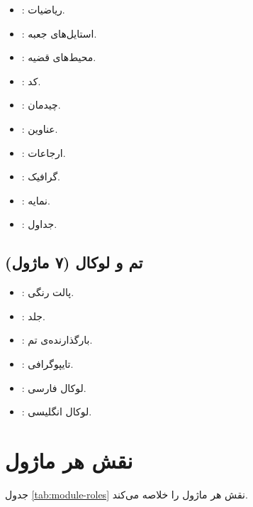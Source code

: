 \begin{itemize}
    \item {}: ریاضیات.
    \item {}: استایل‌های
    جعبه.
    \item {}: محیط‌های
    قضیه.
    \item {}: کد.
    \item {}: چیدمان.
    \item {}: عناوین.
    \item {}: ارجاعات.
    \item {}: گرافیک.
    \item {}: نمایه.
    \item {}: جداول.
\end{itemize}

\subsection{تم و لوکال (۷ ماژول)}
\label{sec:modules-theme}

\begin{itemize}
    \item {}: پالت
    رنگی.
    \item {}: جلد.
    \item {}:
    بارگذارنده‌ی تم.
    \item {}:
    تایپوگرافی.
    \item {}: لوکال فارسی.
    \item {}: لوکال انگلیسی.
\end{itemize}


\section{نقش هر ماژول}
\label{sec:modules-roles}

جدول \cref{tab:module-roles} نقش هر ماژول
را خلاصه می‌کند.

